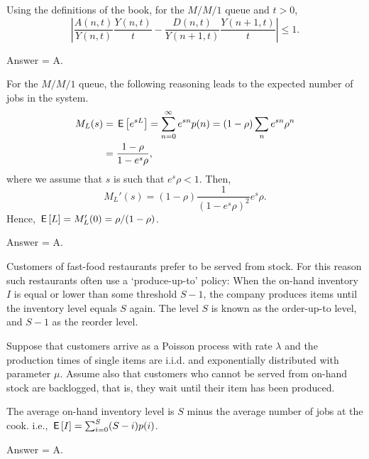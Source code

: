 \begin{exercise}[201803]
Using the definitions of the book, for the $M/M/1$ queue and $t>0$, 
\begin{equation*}
\left| \frac{A(n,t)}{Y(n,t)}\frac{Y(n,t)}t - \frac{D(n,t)}{Y(n+1,t)}\frac{Y(n+1,t)}t \right| \leq 1. 
\end{equation*}
\begin{solution}
Answer = A.
\end{solution}
\end{exercise}

\begin{exercise}[201803]
For the $M/M/1$ queue, the following reasoning leads to the expected number of jobs in the system.
\begin{equation*}
 \begin{split}
 M_L(s) 
&= \,\mathsf{E}\left[e^{s L}\right] = \sum_{n=0}^\infty e^{s n}p(n) = (1-\rho) \sum_n e^{s n} \rho^n \\
&=\frac{1-\rho}{1-e^{s}\rho},
 \end{split}
\end{equation*}
where we assume that $s$ is such that $e^s \rho < 1$. Then, 
\begin{equation*}
 M_L'(s) = (1-\rho) \frac{1}{(1-e^s\rho)^2} e^s \rho.
\end{equation*}
Hence, $\,\mathsf{E}\left[L\right] = M_L'(0) = \rho/(1-\rho)$.
\begin{solution}
Answer = A.
\end{solution}
\end{exercise}

\begin{exercise}[201803]
Customers of fast-food restaurants prefer to be served from stock. For this reason such
restaurants often use a `produce-up-to' policy: When the on-hand inventory $I$ is equal or lower than some threshold $S-1$, the company produces items until the inventory level equals $S$ again. The level $S$ is known as the order-up-to level, and $S-1$ as the reorder level.

Suppose that customers arrive as a Poisson process with rate $\lambda$
and the production times of single items are i.i.d. and exponentially
distributed with parameter $\mu$. Assume also that customers who
cannot be served from on-hand stock are backlogged, that is, they wait
until their item has been produced. 

The average on-hand inventory level is $S$ minus the average number of jobs at the cook. i.e., $\,\mathsf{E}\left[I\right] = \sum_{i=0}^{S} (S-i) p(i)$. 
\begin{solution}
Answer = A.
\end{solution}
\end{exercise}

